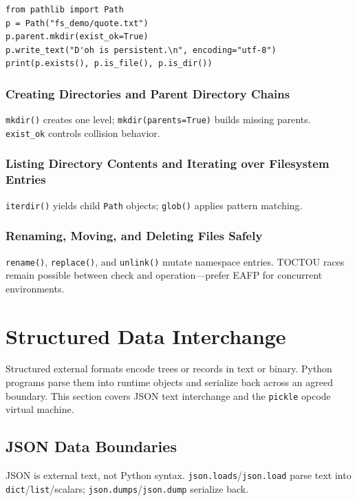 \documentclass[a4paper,twoside]{report}
\begin{document}
\begin{verbatim}
from pathlib import Path
p = Path("fs_demo/quote.txt")
p.parent.mkdir(exist_ok=True)
p.write_text("D'oh is persistent.\n", encoding="utf-8")
print(p.exists(), p.is_file(), p.is_dir())
\end{verbatim}

\subsubsection{Creating Directories and Parent Directory Chains}

\texttt{mkdir()} creates one level; \texttt{mkdir(parents=True)} builds missing parents. \texttt{exist\_ok} controls collision behavior.

\subsubsection{Listing Directory Contents and Iterating over Filesystem Entries}

\texttt{iterdir()} yields child \texttt{Path} objects; \texttt{glob()} applies pattern matching.

\subsubsection{Renaming, Moving, and Deleting Files Safely}

\texttt{rename()}, \texttt{replace()}, and \texttt{unlink()} mutate namespace entries. TOCTOU races remain possible between check and operation---prefer EAFP for concurrent environments.


\section{Structured Data Interchange}

Structured external formats encode trees or records in text or binary. Python programs parse them into runtime objects and serialize back across an agreed boundary. This section covers JSON text interchange and the \texttt{pickle} opcode virtual machine.


\subsection{JSON Data Boundaries}

JSON is external text, not Python syntax. \texttt{json.loads}/\texttt{json.load} parse text into \texttt{dict}/\texttt{list}/scalars; \texttt{json.dumps}/\texttt{json.dump} serialize back.
\end{document}
